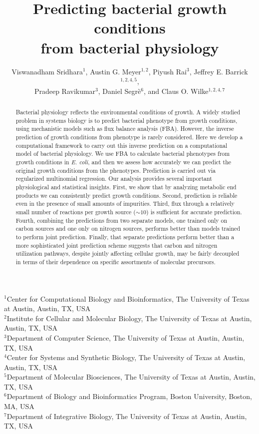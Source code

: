 \documentclass[12pt]{article}
\begin{document}
\title{Predicting bacterial growth conditions\\from bacterial physiology}

\author{Viswanadham Sridhara$^1$, Austin G. Meyer$^{1,2}$, Piyush Rai$^3$, Jeffrey E. Barrick$^{1,2,4,5}$,\\
Pradeep Ravikumar$^3$, Daniel Segr\`e$^6$, and Claus O. Wilke$^{1,2,4,7}$}
\maketitle

\noindent
$^1$Center for Computational Biology and Bioinformatics, The University of Texas at Austin, Austin, TX, USA\\
$^2$Institute for Cellular and Molecular Biology, The University of Texas at Austin, Austin, TX, USA\\
$^3$Department of Computer Science, The University of Texas at Austin, Austin, TX, USA\\
$^4$Center for Systems and Synthetic Biology, The University of Texas at Austin, Austin, TX, USA\\
$^5$Department of Molecular Biosciences, The University of Texas at Austin, Austin, TX, USA\\
$^6$Department of Biology and Bioinformatics Program, Boston University, Boston, MA, USA\\
$^7$Department of Integrative Biology, The University of Texas at Austin, Austin, TX, USA\\


\begin{abstract}
Bacterial physiology reflects the environmental conditions of growth. A widely studied problem in systems biology is to predict bacterial phenotype from growth conditions, using mechanistic models such as flux balance analysis (FBA). However, the inverse prediction of growth conditions from phenotype is rarely considered. Here we develop a computational framework to carry out this inverse prediction on a computational model of bacterial physiology. We use FBA to calculate bacterial phenotypes from growth conditions in \emph{E. coli}, and then we assess how accurately we can predict the original growth conditions from the phenotypes. Prediction is carried out via regularized multinomial regression. Our analysis provides several important physiological and statistical insights. First, we show that by analyzing metabolic end products we can consistently predict growth conditions. Second, prediction is reliable even in the presence of small amounts of impurities. Third, flux through a relatively small number of reactions per growth source ($\mathord{\sim}10$) is sufficient for accurate prediction. Fourth, combining the predictions from two separate models, one trained only on carbon sources and one only on nitrogen sources, performs better than models trained to perform joint prediction. Finally, that separate predictions perform better than a more sophisticated joint prediction scheme suggests that carbon and nitrogen utilization pathways, despite jointly affecting cellular growth, may be fairly decoupled in terms of their dependence on specific assortments of molecular precursors.
\end{abstract}
\end{document}
